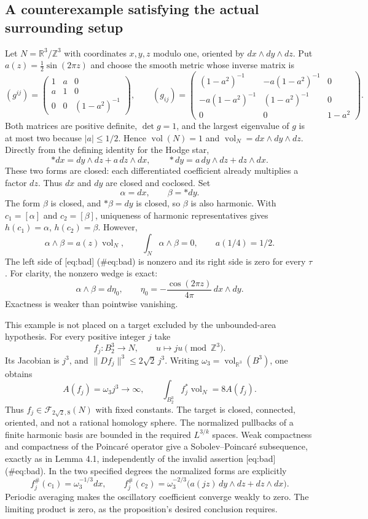 \documentclass[10pt]{article}
\begin{document}
\subsection*{A counterexample satisfying the actual surrounding setup}
Let \(N=\mathbb R^3/\mathbb Z^3\) with coordinates \(x,y,z\) modulo one, oriented by \(dx\wedge dy\wedge dz\). Put \(a(z)=\frac12\sin(2\pi z)\) and choose the smooth metric whose inverse matrix is \[(g^{ij})=
 \begin{pmatrix}
 1&a&0\\ a&1&0\\0&0&(1-a^2)^{-1}
 \end{pmatrix},
 \qquad
 (g_{ij})=
 \begin{pmatrix}
 (1-a^2)^{-1}&-a(1-a^2)^{-1}&0\\
 -a(1-a^2)^{-1}&(1-a^2)^{-1}&0\\
 0&0&1-a^2
 \end{pmatrix}.\] Both matrices are positive definite, \(\det g=1\), and the largest eigenvalue of \(g\) is at most two because \(|a|\le1/2\). Hence \(\operatorname{vol}(N)=1\) and \(\operatorname{vol}_N=dx\wedge dy\wedge dz\). Directly from the defining identity for the Hodge star, \[*dx=dy\wedge dz+a\,dz\wedge dx,\qquad
 *dy=a\,dy\wedge dz+dz\wedge dx .\] These two forms are closed: each differentiated coefficient already multiplies a factor \(dz\). Thus \(dx\) and \(dy\) are closed and coclosed. Set \[\alpha=dx,\qquad \beta=*dy.\] The form \(\beta\) is closed, and \(*\beta=dy\) is closed, so \(\beta\) is also harmonic. With \(c_1=[\alpha]\) and \(c_2=[\beta]\), uniqueness of harmonic representatives gives \(h(c_1)=\alpha\), \(h(c_2)=\beta\). However, \[\alpha\wedge\beta=a(z)\operatorname{vol}_N,\qquad
 \int_N\alpha\wedge\beta=0,\qquad
 a(1/4)=1/2.\] The left side of [eq:bad] (\#eq:bad) is nonzero and its right side is zero for every \(\tau\). For clarity, the nonzero wedge is exact: \[\alpha\wedge\beta=d\eta_0,\qquad
 \eta_0=-\frac{\cos(2\pi z)}{4\pi}\,dx\wedge dy .\] Exactness is weaker than pointwise vanishing.\par
This example is not placed on a target excluded by the unbounded-area hypothesis. For every positive integer \(j\) take \[f_j:B_2^3\longrightarrow N,\qquad u\longmapsto ju\pmod{\mathbb Z^3}.\] Its Jacobian is \(j^3\), and \(\|Df_j\|^3\le2\sqrt2\,j^3\). Writing \(\omega_3=\operatorname{vol}_{\mathbb R^3}(B^3)\), one obtains \[A(f_j)=\omega_3j^3\longrightarrow\infty,\qquad
 \int_{B_2^3}f_j^*\operatorname{vol}_N=8A(f_j).\] Thus \(f_j\in\mathcal F_{2\sqrt2,8}(N)\) with fixed constants. The target is closed, connected, oriented, and not a rational homology sphere. The normalized pullbacks of a finite harmonic basis are bounded in the required \(L^{3/k}\) spaces. Weak compactness and compactness of the Poincaré operator give a Sobolev–Poincaré subsequence, exactly as in Lemma 4.1, independently of the invalid assertion [eq:bad] (\#eq:bad). In the two specified degrees the normalized forms are explicitly \[f_j^\#(c_1)=\omega_3^{-1/3}dx,\qquad
 f_j^\#(c_2)=\omega_3^{-2/3}
       \bigl(a(jz)\,dy\wedge dz+dz\wedge dx\bigr).\] Periodic averaging makes the oscillatory coefficient converge weakly to zero. The limiting product is zero, as the proposition’s desired conclusion requires.\par
\end{document}
